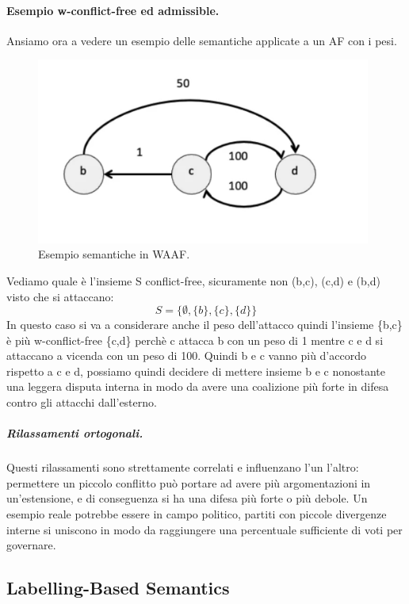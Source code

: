 \paragraph{Esempio w-conflict-free ed admissible.}
Ansiamo ora a vedere un esempio delle semantiche applicate a un AF con i pesi. 
\begin{figure}[H]
    \centering
    \includegraphics[width=11cm, keepaspectratio]{img/es_w_semantics.png}
    \caption{Esempio semantiche in WAAF.}\label{fig:es_w_semantics}
\end{figure}
Vediamo quale è l'insieme S conflict-free, sicuramente non (b,c), (c,d) e (b,d) visto che si attaccano:
\[S=\{ \emptyset,\{b\},\{c\},\{d\}\}\]
In questo caso si va a considerare anche il peso dell'attacco quindi l'insieme \{b,c\} è più w-conflict-free \{c,d\} perchè c attacca b con un peso di 1 mentre c e d si attaccano a vicenda con un peso di 100. Quindi b e c vanno più d'accordo rispetto a c e d, possiamo quindi decidere di mettere insieme b e c nonostante una leggera disputa interna in modo da avere una coalizione più forte in difesa contro gli attacchi dall'esterno. 
\subparagraph{Rilassamenti ortogonali.} Questi rilassamenti sono strettamente correlati e influenzano l'un l'altro: permettere un piccolo conflitto può portare ad avere più argomentazioni in un'estensione, e di conseguenza si ha una difesa più forte o più debole. Un esempio reale potrebbe essere in campo politico, partiti con piccole divergenze interne si uniscono in modo da raggiungere una percentuale sufficiente di voti per governare.


\subsection{Labelling-Based Semantics}
